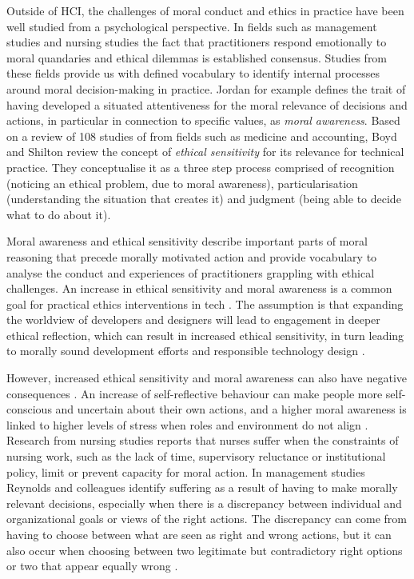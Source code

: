 Outside of HCI, the challenges of moral conduct and ethics in practice have been well studied from a psychological perspective.
In fields such as management studies and nursing studies the fact that practitioners respond emotionally to moral quandaries and ethical dilemmas is established consensus. Studies from these fields provide us with defined vocabulary to identify internal processes around moral decision-making in practice. Jordan \cite{jordan2009social} for example defines the trait of having developed a situated attentiveness for the moral relevance of decisions and actions, in particular in connection to specific values, as \textit{moral awareness}. Based on a review of 108 studies of from fields such as medicine and accounting, Boyd and Shilton \cite{boyd2021adapting} review the concept of \textit{ethical sensitivity} for its relevance for technical practice. They conceptualise it as a three step process comprised of recognition (noticing an ethical problem, due to moral awareness), particularisation (understanding the situation that creates it) and judgment (being able to decide what to do about it).

Moral awareness and ethical sensitivity describe important parts of moral reasoning that precede morally motivated action and provide vocabulary to analyse the conduct and experiences of practitioners grappling with ethical challenges. An increase in ethical sensitivity and moral awareness is a common goal for practical ethics interventions in tech \cite{Boyd_2022_DesigningUp}. The assumption is that expanding the worldview of developers and designers will lead to engagement in deeper ethical reflection, which can result in increased ethical sensitivity, in turn leading to morally sound development efforts and responsible technology design \cite{vanhee2022ethical}.

However, increased ethical sensitivity and moral awareness can also have negative consequences \cite{weaver2007ethical}. An increase of self-reflective behaviour can make people more self-conscious and uncertain about their own actions, and a higher moral awareness is linked to higher levels of stress when roles and environment do not align \cite{Ames2020Antecedentsandconsequences}. Research from nursing studies reports that nurses suffer when the constraints of nursing work, such as the lack of time, supervisory reluctance or institutional policy, limit or prevent capacity for moral action\cite{corley2001development}. In management studies Reynolds and colleagues \cite{reynolds2012moral} identify suffering as a result of having to make morally relevant decisions, especially when there is a discrepancy between individual and organizational goals or views of the right actions. The discrepancy can come from having to choose between what are seen as right and wrong actions, but it can also occur when choosing between two legitimate but contradictory right options or two that appear equally wrong \cite{reynolds2012moral}.  

